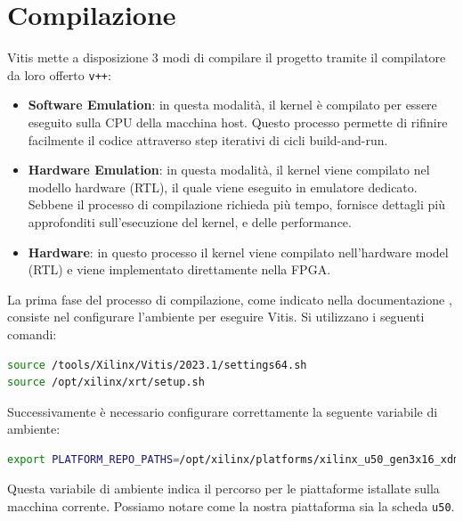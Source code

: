 \clearpage

\section{Compilazione}
\label{compilazione}
Vitis mette a disposizione 3 modi di compilare il progetto tramite il compilatore da loro offerto \texttt{v++}:

\begin{itemize}
    \item \textbf{Software Emulation}: in questa modalità, il kernel è compilato per essere eseguito sulla CPU della macchina host. Questo processo permette di rifinire facilmente il codice attraverso step iterativi di cicli build-and-run.
    \item \textbf{Hardware Emulation}: in questa modalità, il kernel viene compilato nel modello hardware (RTL), il quale viene eseguito in emulatore dedicato. Sebbene il processo di compilazione richieda più tempo, fornisce dettagli più approfonditi sull'esecuzione del kernel, e delle performance.
    \item \textbf{Hardware}: in questo processo il kernel viene compilato nell'hardware model (RTL) e viene implementato direttamente nella FPGA.
\end{itemize}
    
La prima fase del processo di compilazione, come indicato nella documentazione \cite{sitoDocumentazioneVitis}, consiste nel configurare l'ambiente per eseguire Vitis. Si utilizzano i seguenti comandi: 
\begin{lstlisting}[language=Bash]
source /tools/Xilinx/Vitis/2023.1/settings64.sh
source /opt/xilinx/xrt/setup.sh
\end{lstlisting}

Successivamente è necessario configurare correttamente la seguente variabile di ambiente: 
\begin{lstlisting}[language=Bash]
export PLATFORM_REPO_PATHS=/opt/xilinx/platforms/xilinx_u50_gen3x16_xdma_5_202210_1/
\end{lstlisting}
Questa variabile di ambiente indica il percorso per le piattaforme istallate sulla macchina corrente. Possiamo notare come la nostra piattaforma sia la scheda \texttt{u50}.

